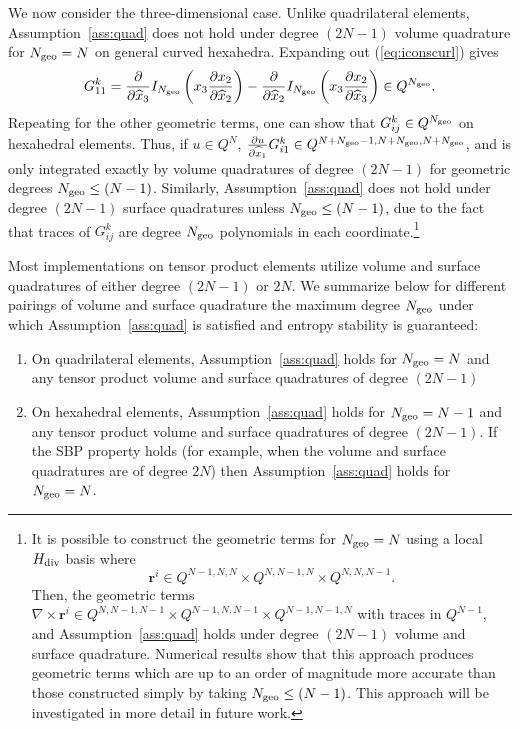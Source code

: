 \documentclass{svjour3}                     %
\renewcommand{\hat}{\widehat}
\newcommand{\pd}[2]{\frac{\partial#1}{\partial#2}}
\newcommand{\LRp}[1]{\left( #1 \right)}
\newcommand{\Grad} {\ensuremath{\nabla}}
\begin{document}
We now consider the three-dimensional case.  Unlike quadrilateral elements, Assumption~\ref{ass:quad} does not hold under degree $(2N-1)$ volume quadrature for $N_{\rm geo} = N$ on general curved hexahedra.  Expanding out (\ref{eq:iconscurl}) gives
\[
G^k_{11} = \pd{}{\hat{x}_3} I_{N_{\rm geo}}\LRp{{x}_3 \pd{x_2}{\hat{x}_2}} - \pd{}{\hat{x}_2} I_{N_{\rm geo}}\LRp{{x}_3 \pd{x_2}{\hat{x}_3}} \in Q^{N_{\rm geo}}.
\]
Repeating for the other geometric terms, one can show that $G^k_{ij} \in Q^{N_{\rm geo}}$ on hexahedral elements.  Thus, if $u\in Q^N$, $\pd{u}{\hat{x}_1} G^k_{i1} \in Q^{N+N_{\rm geo}-1,N+N_{\rm geo},N+N_{\rm geo}}$, and is only integrated exactly by volume quadratures of degree $(2N-1)$ for geometric degrees $N_{\rm geo}\leq (N-1)$.  Similarly, Assumption~\ref{ass:quad} does not hold under degree $(2N-1)$ surface quadratures unless $N_{\rm geo} \leq (N-1)$, due to the fact that traces of $G^k_{ij}$ are degree $N_{\rm geo}$ polynomials in each coordinate.\footnote{It is possible to  construct the geometric terms for $N_{\rm geo} = N$ using a local $H_{\rm div}$ basis where 
\[
\bm{r}^i \in Q^{N-1,N,N} \times Q^{N,N-1,N} \times Q^{N,N,N-1}.
\]  
Then, the geometric terms $\Grad \times \bm{r}^i \in Q^{N,N-1,N-1}\times Q^{N-1,N,N-1} \times Q^{N-1,N-1,N}$ with traces in $Q^{N-1}$, and Assumption~\ref{ass:quad} holds under degree $(2N-1)$ volume and surface quadrature.  Numerical results show that this approach produces geometric terms which are up to an order of magnitude more accurate than those constructed simply by taking $N_{\rm geo} \leq (N-1)$.  This approach will be investigated in more detail in future work.
}

Most implementations on tensor product elements utilize volume and surface quadratures of either degree $(2N-1)$ or $2N$.  We summarize below for different pairings of volume and surface quadrature the maximum degree $N_{\rm geo}$ under which Assumption~\ref{ass:quad} is satisfied and entropy stability is guaranteed:
\begin{enumerate}
\item On quadrilateral elements, Assumption~\ref{ass:quad} holds for $N_{\rm geo} = N$ and any tensor product volume and surface quadratures of degree $(2N-1)$ 
\item On hexahedral elements, Assumption~\ref{ass:quad} holds for $N_{\rm geo} = N-1$ and any tensor product volume and surface quadratures of degree $(2N-1)$.  If the SBP property holds (for example, when the volume and surface quadratures are of degree $2N$) then Assumption~\ref{ass:quad} holds for $N_{\rm geo} = N$.
\end{enumerate}
\end{document}
